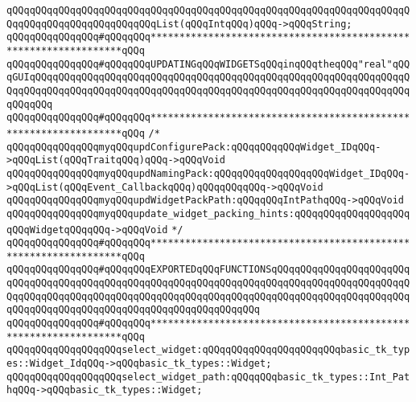 \verb|qQQqqQQqqQQqqQQqqQQqqQQqqQQqqQQqqQQqqQQqqQQqqQQqqQQqqQQqqQQqqQQqqQQqqQQqqQQqqQQqqQQqqQQqqQQqqQQqList(qQQqIntqQQq)qQQq->qQQqString;|\newline
\newline
\newline
\verb|qQQqqQQqqQQqqQQq#qQQqqQQq*****************************************************************qQQq|\newline
\verb|qQQqqQQqqQQqqQQq#qQQqqQQqUPDATINGqQQqWIDGETSqQQqinqQQqtheqQQq"real"qQQqGUIqQQqqQQqqQQqqQQqqQQqqQQqqQQqqQQqqQQqqQQqqQQqqQQqqQQqqQQqqQQqqQQqqQQqqQQqqQQqqQQqqQQqqQQqqQQqqQQqqQQqqQQqqQQqqQQqqQQqqQQqqQQqqQQqqQQqqQQqqQQqqQQq|\newline
\verb|qQQqqQQqqQQqqQQq#qQQqqQQq*****************************************************************qQQq|\newline
\verb|/*|\newline
\verb|qQQqqQQqqQQqqQQqmyqQQqupdConfigurePack:qQQqqQQqqQQqWidget_IDqQQq->qQQqList(qQQqTraitqQQq)qQQq->qQQqVoid|\newline
\verb|qQQqqQQqqQQqqQQqmyqQQqupdNamingPack:qQQqqQQqqQQqqQQqqQQqWidget_IDqQQq->qQQqList(qQQqEvent_CallbackqQQq)qQQqqQQqqQQq->qQQqVoid|\newline
\newline
\verb|qQQqqQQqqQQqqQQqmyqQQqupdWidgetPackPath:qQQqqQQqIntPathqQQq->qQQqVoid|\newline
\verb|qQQqqQQqqQQqqQQqmyqQQqupdate_widget_packing_hints:qQQqqQQqqQQqqQQqqQQqqQQqWidgetqQQqqQQq->qQQqVoid|\newline
\verb|*/|\newline
\newline
\verb|qQQqqQQqqQQqqQQq#qQQqqQQq*****************************************************************qQQq|\newline
\verb|qQQqqQQqqQQqqQQq#qQQqqQQqEXPORTEDqQQqFUNCTIONSqQQqqQQqqQQqqQQqqQQqqQQqqQQqqQQqqQQqqQQqqQQqqQQqqQQqqQQqqQQqqQQqqQQqqQQqqQQqqQQqqQQqqQQqqQQqqQQqqQQqqQQqqQQqqQQqqQQqqQQqqQQqqQQqqQQqqQQqqQQqqQQqqQQqqQQqqQQqqQQqqQQqqQQqqQQqqQQqqQQqqQQqqQQqqQQqqQQqqQQqqQQqqQQq|\newline
\verb|qQQqqQQqqQQqqQQq#qQQqqQQq*****************************************************************qQQq|\newline
\newline
\verb|qQQqqQQqqQQqqQQqqQQqselect_widget:qQQqqQQqqQQqqQQqqQQqqQQqbasic_tk_types::Widget_IdqQQq->qQQqbasic_tk_types::Widget;|\newline
\verb|qQQqqQQqqQQqqQQqqQQqselect_widget_path:qQQqqQQqbasic_tk_types::Int_PathqQQq->qQQqbasic_tk_types::Widget;|\newline
